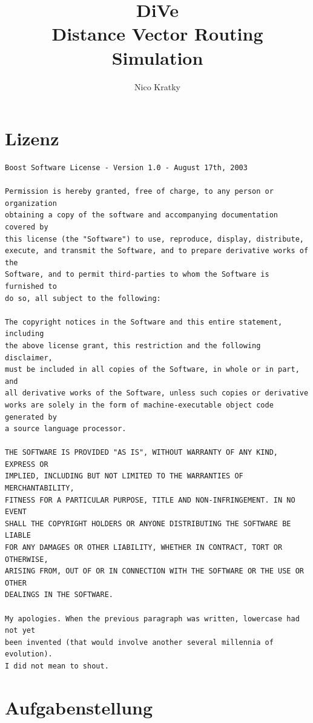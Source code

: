 \documentclass[a4paper,ngerman]{article}
\title{%
    DiVe \\
    Distance Vector Routing Simulation
}
\author{Nico Kratky}
\begin{document}
\begin{titlepage}
\maketitle
\thispagestyle{empty}
\end{titlepage}

\tableofcontents
\clearpage

\section{Lizenz}
\begin{Verbatim}[fontsize=\small]
Boost Software License - Version 1.0 - August 17th, 2003

Permission is hereby granted, free of charge, to any person or organization
obtaining a copy of the software and accompanying documentation covered by
this license (the "Software") to use, reproduce, display, distribute,
execute, and transmit the Software, and to prepare derivative works of the
Software, and to permit third-parties to whom the Software is furnished to
do so, all subject to the following:

The copyright notices in the Software and this entire statement, including
the above license grant, this restriction and the following disclaimer,
must be included in all copies of the Software, in whole or in part, and
all derivative works of the Software, unless such copies or derivative
works are solely in the form of machine-executable object code generated by
a source language processor.

THE SOFTWARE IS PROVIDED "AS IS", WITHOUT WARRANTY OF ANY KIND, EXPRESS OR
IMPLIED, INCLUDING BUT NOT LIMITED TO THE WARRANTIES OF MERCHANTABILITY,
FITNESS FOR A PARTICULAR PURPOSE, TITLE AND NON-INFRINGEMENT. IN NO EVENT
SHALL THE COPYRIGHT HOLDERS OR ANYONE DISTRIBUTING THE SOFTWARE BE LIABLE
FOR ANY DAMAGES OR OTHER LIABILITY, WHETHER IN CONTRACT, TORT OR OTHERWISE,
ARISING FROM, OUT OF OR IN CONNECTION WITH THE SOFTWARE OR THE USE OR OTHER
DEALINGS IN THE SOFTWARE.

My apologies. When the previous paragraph was written, lowercase had not yet
been invented (that would involve another several millennia of evolution).
I did not mean to shout.
\end{Verbatim}
\clearpage

\section{Aufgabenstellung}
\end{document}
